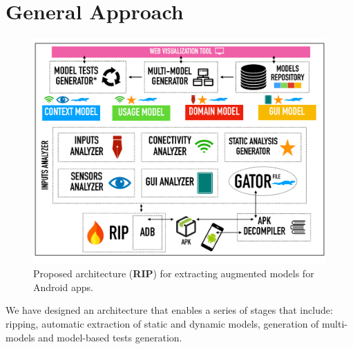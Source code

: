 
\section{General Approach}

\begin{figure}[t]
	\centering
	\includegraphics[width=1\textwidth]{img/generalArchitecture.pdf}
	\vspace{-0.8cm}
	\caption{Proposed architecture (\textbf{RIP}) for extracting augmented models for Android apps.}
	\label{generalArchitecture}
\end{figure}	

We have designed an  architecture  that enables a series of stages that include: ripping, automatic extraction of static and dynamic models, generation of multi-models and model-based tests generation.

